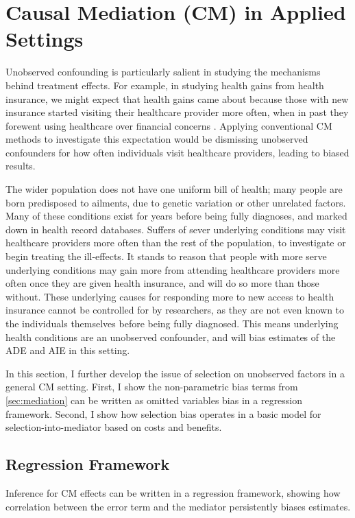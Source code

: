 \section{Causal Mediation (CM) in Applied Settings}
\label{sec:applied}
Unobserved confounding is particularly salient in studying the mechanisms behind treatment effects.
For example, in studying health gains from health insurance, we might expect that health gains came about because those with new insurance started visiting their healthcare provider more often, when in past they forewent using healthcare over financial concerns \citep{finkelstein2008oregon}.
Applying conventional CM methods to investigate this expectation would be dismissing unobserved confounders for how often individuals visit healthcare providers, leading to biased results.

The wider population does not have one uniform bill of health; many people are born predisposed to ailments, due to genetic variation or other unrelated factors.
Many of these conditions exist for years before being fully diagnoses, and marked down in health record databases.
Suffers of sever underlying conditions may visit healthcare providers more often than the rest of the population, to investigate or begin treating the ill-effects.
It stands to reason that people with more serve underlying conditions may gain more from attending healthcare providers more often once they are given health insurance, and will do so more than those without.
These underlying causes for responding more to new access to health insurance cannot be controlled for by researchers, as they are not even known to the individuals themselves before being fully diagnosed.
This means underlying health conditions are an unobserved confounder, and will bias estimates of the ADE and AIE in this setting.

In this section, I further develop the issue of selection on unobserved factors in a general CM setting.
First, I show the non-parametric bias terms from \autoref{sec:mediation} can be written as omitted variables bias in a regression framework.
Second, I show how selection bias operates in a basic model for selection-into-mediator based on costs and benefits.

\subsection{Regression Framework}
\label{sec:regression}
Inference for CM effects can be written in a regression framework, showing how correlation between the error term and the mediator persistently biases estimates.

